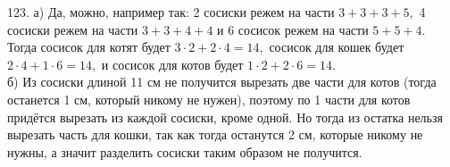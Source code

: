123. а) Да, можно, например так: 2 сосиски режем на части $3+3+3+5,$ 4 сосиски режем на части $3+3+4+4$ и 6 сосисок режем на части $5+5+4.$ Тогда сосисок для котят будет $3\cdot2+2\cdot4=14,$ сосисок для кошек будет $2\cdot4+1\cdot6=14,$ и сосисок для котов будет $1\cdot2+2\cdot6=14.$\\
б) Из сосиски длиной 11 см не получится вырезать две части для котов (тогда останется 1 см, который никому не нужен), поэтому по 1 части для котов придётся вырезать из каждой сосиски, кроме одной. Но тогда из остатка нельзя вырезать часть для кошки, так как тогда останутся 2 см, которые никому не нужны, а значит разделить сосиски таким образом не получится.\\
